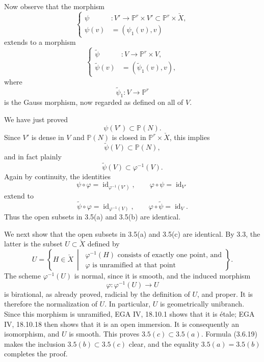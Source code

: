 Now observe that the morphism
\begin{equation}\tag{3.6.13}
\left\{
\begin{aligned}
\psi &:V'\longrightarrow
  \mathbb P^r\times V'\subset\mathbb P^r\times\check X,\\
\psi(v)&=(\psi_1(v),v)
\end{aligned}
\right.
\end{equation}
extends to a morphism
\begin{equation}\tag{3.6.14}
\left\{
\begin{aligned}
\widetilde\psi &:V\longrightarrow\mathbb P^r\times V,\\
\widetilde\psi(v)&=(\widetilde\psi_1(v),v),
\end{aligned}
\right.
\end{equation}
where
\begin{equation}\tag{3.6.15}
\widetilde\psi_1:V\longrightarrow\mathbb P^r
\end{equation}
is the Gauss morphism, now regarded as defined on all of $V$.

We have just proved
\begin{equation}\tag{3.6.16}
\psi(V')\subset\mathbb P(N).
\end{equation}
Since $V'$ is dense in $V$ and $\mathbb P(N)$ is closed in
$\mathbb P^r\times\check X$, this implies
\begin{equation}\tag{3.6.17}
\widetilde\psi(V)\subset\mathbb P(N),
\end{equation}
and in fact plainly
\begin{equation}\tag{3.6.18}
\widetilde\psi(V)\subset\varphi^{-1}(V).
\end{equation}
Again by continuity, the identities
\[
\psi\circ\varphi=\operatorname{id}_{\varphi^{-1}(V')},
\qquad
\varphi\circ\psi=\operatorname{id}_{V'}
\]
extend to
\[
\widetilde\psi\circ\varphi=\operatorname{id}_{\varphi^{-1}(V)},
\qquad
\varphi\circ\widetilde\psi=\operatorname{id}_{V}.
\]
Thus the open subsets in 3.5(a) and 3.5(b) are identical.

We next show that the open subsets in 3.5(a) and 3.5(c) are
identical.  By 3.3, the latter is the subset $U\subset\check X$
defined by
\begin{equation}\tag{3.6.19}
U=\left\{H\in\check X\ \middle|\
\begin{array}{l}
\varphi^{-1}(H)\text{ consists of exactly one point, and}\\
\varphi\text{ is unramified at that point}
\end{array}
\right\}.
\end{equation}
The scheme $\varphi^{-1}(U)$ is normal, since it is smooth, and the
induced morphism
\[
\varphi:\varphi^{-1}(U)\longrightarrow U
\]
is birational, as already proved, radicial by the definition of $U$,
and proper.  It is therefore the normalization of $U$.  In
particular, $U$ is geometrically unibranch.  Since this morphism is
unramified, EGA IV, 18.10.1 shows that it is étale; EGA IV, 18.10.18
then shows that it is an open immersion.  It is consequently an
isomorphism, and $U$ is smooth.  This proves
$3.5(c)\subset 3.5(a)$.  Formula (3.6.19) makes the inclusion
$3.5(b)\subset 3.5(c)$ clear, and the equality
$3.5(a)=3.5(b)$ completes the proof.
